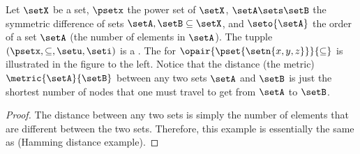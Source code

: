 \begin{minipage}{\tw-43mm}\raggedright
\begin{example}
\label{ex:d_powerset}
\footnotemark
{}
Let $\setX$ be a set, $\psetx$ the power set of $\setX$,
$\setA\sets \setB$ the symmetric difference of sets $\setA,\setB\subseteq \setX$,
and $\seto{\setA}$ the order of a set $\setA$ (the number of elements in $\setA$).\footnotemark
{}
The tupple $(\psetx,\subseteq,\setu,\seti)$ is a .
The  for $\opair{\pset{\setn{x,y,z}}}{\subseteq}$
is illustrated in
the figure to the left.
Notice that the distance (the metric) $\metric{\setA}{\setB}$ between any two sets $\setA$ and $\setB$
is just the shortest number of nodes that one must travel to get from $\setA$ to $\setB$.
\end{example}
\end{minipage}
\begin{proof}
The distance between any two sets is simply the number of elements that
are different between the two sets.
Therefore, this example is essentially the same as 
(Hamming distance example).
\end{proof}



